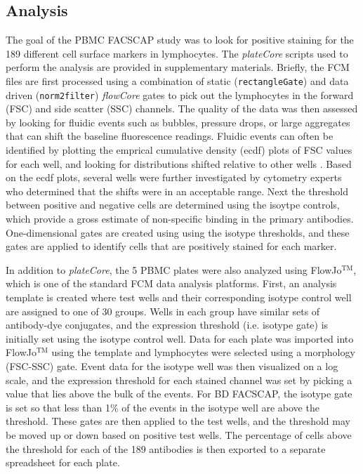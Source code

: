 \documentclass[12pt]{article}
\newcommand{\Robject}[1]{{\texttt{#1}}}
\newcommand{\Rpackage}[1]{{\textit{#1}}}
\begin{document}
\subsection*{Analysis}

The goal of the PBMC FACS\texttrademark CAP study was to look for positive staining for the 189 different cell
surface markers in lymphocytes. The \Rpackage{plateCore} scripts used to perform the analysis are provided 
in supplementary materials. Briefly, the FCM files are first processed using a combination of static (\Robject{rectangleGate})
and data driven (\Robject{norm2filter}) \Rpackage{flowCore} gates to pick out the lymphocytes in the forward (FSC) and side scatter (SSC)
channels.  The quality of the data was then assessed by looking for fluidic events such as bubbles,
pressure drops, or large aggregates that can shift the baseline fluorescence readings. 
Fluidic events can often be identified by plotting the emprical cumulative density (ecdf) plots of FSC
values for each well, and looking for distributions shifted relative to other wells \citep{lemeur2007}. Based on the ecdf
plots, several wells were further investigated by cytometry experts who determined that the shifts were in an acceptable range.
Next the threshold between positive and negative cells are determined using the isoytpe controls, which provide a gross estimate
of non-specific binding in the primary antibodies. One-dimensional gates are created using using the isotype thresholds, and these
gates are applied to identify cells that are positively stained for each marker. 

In addition to \Rpackage{plateCore}, the 5 PBMC plates were also analyzed using FlowJo$^{\text{TM}}$,
which is one of the standard FCM data analysis platforms. First, an analysis template is created
where test wells and their corresponding isotype control well are assigned to one of 30 groups. Wells in each
group have similar sets of antibody-dye conjugates, and the expression threshold (i.e. isotype gate)
is initially set using the isotype control well. Data for each plate was imported into FlowJo$^{\text{TM}}$
using the template and
lymphocytes were selected using a morphology (FSC-SSC) gate. Event data for the isotype well was then
visualized on a log scale, and the expression threshold for each stained channel was set by picking a
value that lies above the bulk of the events. For BD FACS\texttrademark CAP, the isotype gate is set so that less than
1\% of the events in the isotype well are above the threshold. These gates are then applied to the test
wells, and the threshold may be moved up or down based on positive test wells. The percentage
of cells above the threshold for each of the 189 antibodies is then exported to a separate spreadsheet for 
each plate.
\end{document}

